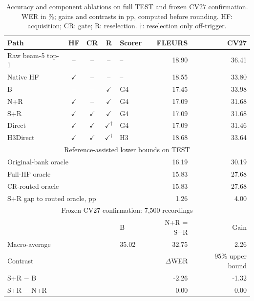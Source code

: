 \begin{table}[t]\centering\footnotesize
\caption{Accuracy and component ablations on full TEST and frozen CV27 confirmation. WER in \%; gains and contrasts in pp, computed before rounding. HF: acquisition; CR: gate; R: reselection. $\dagger$: reselection only off-trigger.}\label{tab:paths}
\setlength{\tabcolsep}{3pt}\renewcommand{\arraystretch}{1.03}
\begin{tabular}{@{}lccclrr@{}}\toprule
Path & HF & CR & R & Scorer & FLEURS & CV27\\\midrule
Raw beam-5 top-1 & -- & -- & -- & -- & 18.90 & 36.41\\
Native HF & $\checkmark$ & -- & -- & -- & 18.55 & 33.80\\
B & -- & -- & $\checkmark$ & G4 & 17.45 & 33.98\\
N+R & $\checkmark$ & -- & $\checkmark$ & G4 & 17.09 & 31.68\\
S+R & $\checkmark$ & $\checkmark$ & $\checkmark$ & G4 & 17.09 & 31.68\\
Direct & $\checkmark$ & $\checkmark$ & $\checkmark^{\dagger}$ & G4 & 17.09 & 31.46\\
H3Direct & $\checkmark$ & $\checkmark$ & $\checkmark^{\dagger}$ & H3 & 18.68 & 33.64\\
\midrule\multicolumn{7}{c}{Reference-assisted lower bounds on TEST}\\
\multicolumn{5}{l}{Original-bank oracle} & 16.19 & 30.19\\
\multicolumn{5}{l}{Full-HF oracle} & 15.83 & 27.68\\
\multicolumn{5}{l}{CR-routed oracle} & 15.83 & 27.68\\
\multicolumn{5}{l}{S+R gap to routed oracle, pp} & 1.26 & 4.00\\
\midrule\multicolumn{7}{c}{Frozen CV27 confirmation: 7,500 recordings}\\
\multicolumn{4}{l}{} & B & N+R = S+R & Gain\\\midrule
\multicolumn{4}{l}{Macro-average} & 35.02 & 32.75 & 2.26\\
\midrule\multicolumn{5}{l}{Contrast} & $\Delta$WER & 95\% upper bound\\
\multicolumn{5}{l}{S+R $-$ B} & -2.26 & -1.32\\
\multicolumn{5}{l}{S+R $-$ N+R} & 0.00 & 0.00\\
\bottomrule\end{tabular}\end{table}

